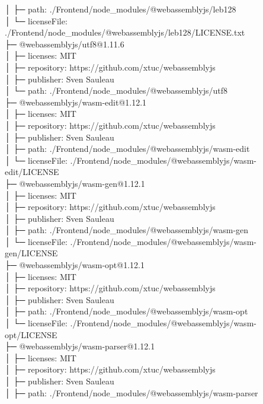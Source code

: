 │  ├─ path: ./Frontend/node\_modules/@webassemblyjs/leb128\\
│  └─ licenseFile: ./Frontend/node\_modules/@webassemblyjs/leb128/LICENSE.txt\\
├─ @webassemblyjs/utf8@1.11.6\\
│  ├─ licenses: MIT\\
│  ├─ repository: https://github.com/xtuc/webassemblyjs\\
│  ├─ publisher: Sven Sauleau\\
│  └─ path: ./Frontend/node\_modules/@webassemblyjs/utf8\\
├─ @webassemblyjs/wasm-edit@1.12.1\\
│  ├─ licenses: MIT\\
│  ├─ repository: https://github.com/xtuc/webassemblyjs\\
│  ├─ publisher: Sven Sauleau\\
│  ├─ path: ./Frontend/node\_modules/@webassemblyjs/wasm-edit\\
│  └─ licenseFile: ./Frontend/node\_modules/@webassemblyjs/wasm-edit/LICENSE\\
├─ @webassemblyjs/wasm-gen@1.12.1\\
│  ├─ licenses: MIT\\
│  ├─ repository: https://github.com/xtuc/webassemblyjs\\
│  ├─ publisher: Sven Sauleau\\
│  ├─ path: ./Frontend/node\_modules/@webassemblyjs/wasm-gen\\
│  └─ licenseFile: ./Frontend/node\_modules/@webassemblyjs/wasm-gen/LICENSE\\
├─ @webassemblyjs/wasm-opt@1.12.1\\
│  ├─ licenses: MIT\\
│  ├─ repository: https://github.com/xtuc/webassemblyjs\\
│  ├─ publisher: Sven Sauleau\\
│  ├─ path: ./Frontend/node\_modules/@webassemblyjs/wasm-opt\\
│  └─ licenseFile: ./Frontend/node\_modules/@webassemblyjs/wasm-opt/LICENSE\\
├─ @webassemblyjs/wasm-parser@1.12.1\\
│  ├─ licenses: MIT\\
│  ├─ repository: https://github.com/xtuc/webassemblyjs\\
│  ├─ publisher: Sven Sauleau\\
│  ├─ path: ./Frontend/node\_modules/@webassemblyjs/wasm-parser\\
